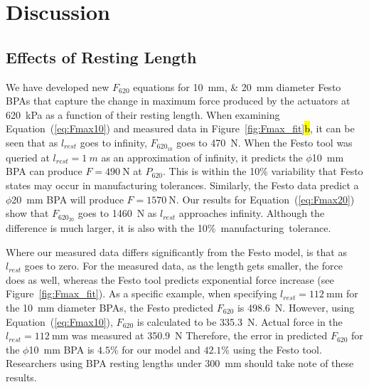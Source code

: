 \documentclass[actuators,article,accept,pdftex,moreauthors]{Definitions/mdpi}
\begin{document}
\section{Discussion}

\subsection{Effects of Resting Length}
We have developed new $F_{620}$ equations for \qtylist{10;20}{\mm} diameter Festo BPAs that capture the change in maximum force produced by the actuators at  \qty{620}{\kPa} as a function of their resting length. When examining Equation~(\ref{eq:Fmax10}) and measured data in Figure~\ref{fig:Fmax_fit}\hl{b}, it can be seen that as $l_{rest}$ goes to infinity, $F_{620_{10}}$ goes to \qty{470}{\N}. When the Festo tool \citep{lang_robert_musclesim_2005} was queried at $l_{rest}=\qty{1}{m}$ as an approximation of infinity, it predicts the $\phi$\qty{10}{\mm} BPA can produce $F=\qty{490}{\N}$ at $P_{620}$. This is within the 10\% variability that Festo states may occur in manufacturing tolerances. Similarly, the Festo data predict a $\phi$\qty{20}{\mm} BPA will produce $F=\qty{1570}{\N}$. Our results for Equation~(\ref{eq:Fmax20}) show that  $F_{620_{20}}$ goes to \qty{1460}{\N} as $l_{rest}$ approaches infinity. Although the difference is much larger, it is also with the \mbox{10\% manufacturing tolerance. }

Where our measured data differs significantly from the Festo model, is that as $l_{rest}$ goes to zero. For the measured data, as the length gets smaller, the force does as well, whereas the Festo tool predicts exponential force increase (see Figure~\ref{fig:Fmax_fit}). As a specific example, when specifying $l_{rest}=\qty{112}{\mm}$ for the \qtylist{10}{\mm} diameter BPAs, the Festo predicted $F_{620}$ is \qtylist{498.6}{\N}. However, using Equation~(\ref{eq:Fmax10}), $F_{620}$ is calculated to be \qtylist{335.3}{\N}. Actual force in the $l_{rest}=\qty{112}{\mm}$ was measured at \qtylist{350.9}{\N} Therefore, the error in predicted $F_{620}$ for the $\phi$\qty{10}{\mm} BPA is $4.5\%$ for our model and $42.1\%$ using the Festo tool. Researchers using BPA resting lengths under \qty{300}{\mm} should take note of these results.
\end{document}
